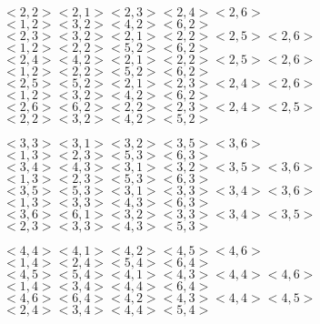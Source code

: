 \documentclass{article}
\begin{document}
\setlength{\parindent}{0cm}
$<2,2>$\hspace{1.7cm}$<2,1><2,3><2,4><2,6>$\hspace{0.5cm}$<1,2><3,2><4,2><6,2>$\\
$<2,3><3,2>$\hspace{0.5cm}$<2,1><2,2><2,5><2,6>$\hspace{0.5cm}$<1,2><2,2><5,2><6,2>$\\
$<2,4><4,2>$\hspace{0.5cm}$<2,1><2,2><2,5><2,6>$\hspace{0.5cm}$<1,2><2,2><5,2><6,2>$\\
$<2,5><5,2>$\hspace{0.5cm}$<2,1><2,3><2,4><2,6>$\hspace{0.5cm}$<1,2><3,2><4,2><6,2>$\\
$<2,6><6,2>$\hspace{0.5cm}$<2,2><2,3><2,4><2,5>$\hspace{0.5cm}$<2,2><3,2><4,2><5,2>$\\
\noindent

\setlength{\parindent}{0cm}
$<3,3>$\hspace{1.7cm}$<3,1><3,2><3,5><3,6>$\hspace{0.5cm}$<1,3><2,3><5,3><6,3>$\\
$<3,4><4,3>$\hspace{0.5cm}$<3,1><3,2><3,5><3,6>$\hspace{0.5cm}$<1,3><2,3><5,3><6,3>$\\
$<3,5><5,3>$\hspace{0.5cm}$<3,1><3,3><3,4><3,6>$\hspace{0.5cm}$<1,3><3,3><4,3><6,3>$\\
$<3,6><6,1>$\hspace{0.5cm}$<3,2><3,3><3,4><3,5>$\hspace{0.5cm}$<2,3><3,3><4,3><5,3>$\\
\noindent

\setlength{\parindent}{0cm}
$<4,4>$\hspace{1.7cm}$<4,1><4,2><4,5><4,6>$\hspace{0.5cm}$<1,4><2,4><5,4><6,4>$\\
$<4,5><5,4>$\hspace{0.5cm}$<4,1><4,3><4,4><4,6>$\hspace{0.5cm}$<1,4><3,4><4,4><6,4>$\\
$<4,6><6,4>$\hspace{0.5cm}$<4,2><4,3><4,4><4,5>$\hspace{0.5cm}$<2,4><3,4><4,4><5,4>$\\
\noindent
\end{document}
